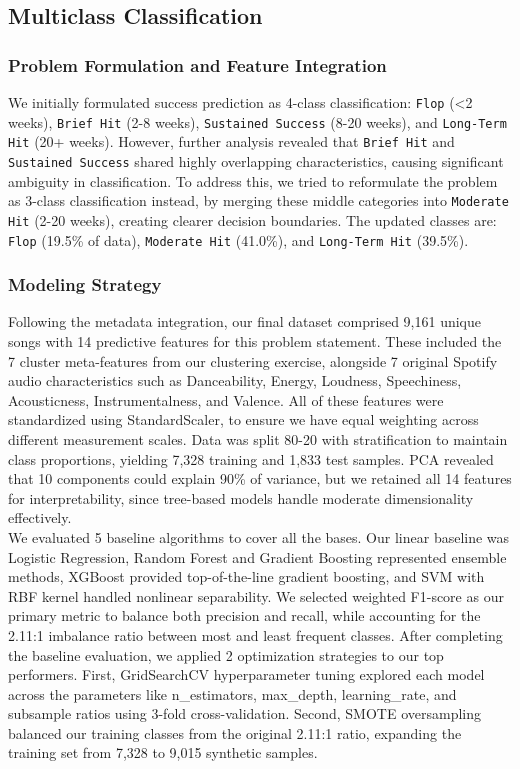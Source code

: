 \documentclass{article}
\begin{document}
\subsection{Multiclass Classification}
\subsubsection{Problem Formulation and Feature Integration}
We initially formulated success prediction as 4-class classification: \texttt{Flop} (<2 weeks), \texttt{Brief Hit} (2-8 weeks), \texttt{Sustained Success} (8-20 weeks), and \texttt{Long-Term Hit} (20+ weeks). However, further analysis revealed that \texttt{Brief Hit} and \texttt{Sustained Success} shared highly overlapping characteristics, causing significant ambiguity in classification. To address this, we tried to reformulate the problem as 3-class classification instead, by merging these middle categories into \texttt{Moderate Hit} (2-20 weeks), creating clearer decision boundaries. The updated classes are:  \texttt{Flop} (19.5\% of data), \texttt{Moderate Hit} (41.0\%), and \texttt{Long-Term Hit} (39.5\%).
\subsubsection{Modeling Strategy}
Following the metadata integration, our final dataset comprised 9,161 unique songs with 14 predictive features for this problem statement. These included the 7 cluster meta-features from our clustering exercise,  alongside 7 original Spotify audio characteristics \cite{fu2010survey, khan2022effect} such as Danceability, Energy, Loudness, Speechiness, Acousticness, Instrumentalness, and Valence. All of these features were standardized using StandardScaler, to ensure we have equal weighting across different measurement scales.
Data was split 80-20 with stratification to maintain class proportions, yielding 7,328 training and 1,833 test samples. PCA revealed that 10 components could explain 90\% of variance, but we retained all 14 features for interpretability, since tree-based models handle moderate dimensionality effectively.
\\
We evaluated 5 baseline algorithms to cover all the bases. Our linear baseline was Logistic Regression, Random Forest and Gradient Boosting represented ensemble methods, XGBoost provided top-of-the-line gradient boosting, and SVM with RBF kernel handled nonlinear separability. We selected weighted F1-score as our primary metric to balance both precision and recall, while accounting for the 2.11:1 imbalance ratio between most and least frequent classes. After completing the baseline evaluation, we applied 2 optimization strategies to our top performers. First, GridSearchCV hyperparameter tuning explored each model across the parameters like n\_estimators, max\_depth, learning\_rate, and subsample ratios using 3-fold cross-validation. Second, SMOTE oversampling balanced our training classes from the original 2.11:1 ratio, expanding the training set from 7,328 to 9,015 synthetic samples.
\end{document}
